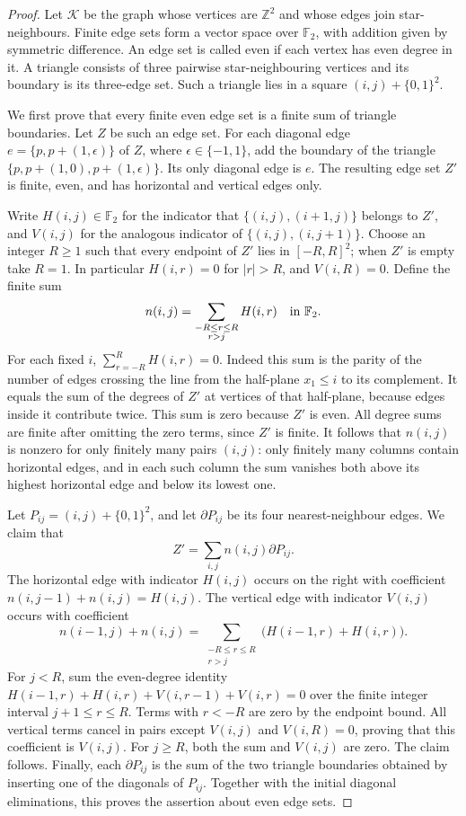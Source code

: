 \begin{proof}
Let \(\mathcal K\) be the graph whose vertices are \(\mathbb Z^2\)
and whose edges join star-neighbours.  Finite edge sets form
a vector space over \(\mathbb F_2\), with addition given by
symmetric difference.  An edge set is called even if each
vertex has even degree in it.  A triangle consists of three
pairwise star-neighbouring vertices and its boundary is its
three-edge set.  Such a triangle lies in a square
\((i,j)+\{0,1\}^2\).

We first prove that every finite even edge set is a finite
sum of triangle boundaries.  Let \(Z\) be such an edge set.
For each diagonal edge \(e=\{p,p+(1,\epsilon)\}\) of \(Z\),
where \(\epsilon\in\{-1,1\}\), add the boundary of the triangle
\(\{p,p+(1,0),p+(1,\epsilon)\}\).  Its only diagonal edge
is \(e\).  The resulting edge set \(Z'\) is finite, even,
and has horizontal and vertical edges only.

Write \(H(i,j)\in\mathbb F_2\) for the indicator that
\(\{(i,j),(i+1,j)\}\) belongs to \(Z'\), and
\(V(i,j)\) for the analogous indicator of
\(\{(i,j),(i,j+1)\}\).  Choose an integer \(R\ge1\) such that
every endpoint of \(Z'\) lies in \([-R,R]^2\); when \(Z'\) is
empty take \(R=1\).  In particular \(H(i,r)=0\) for
\(|r|>R\), and \(V(i,R)=0\).  Define the finite sum
\[
 n(i,j)=\sum_{\substack{-R\le r\le R\\r>j}}H(i,r)
                    \quad\hbox{in }\mathbb F_2.
\]
For each fixed \(i\), \(\sum_{r=-R}^R H(i,r)=0\).  Indeed this sum
is the parity of the number of edges crossing the line from
the half-plane \(x_1\le i\) to its complement.  It equals
the sum of the degrees of \(Z'\) at vertices of that
half-plane, because edges inside it contribute twice.
This sum is zero because \(Z'\) is even.  All degree sums
are finite after omitting the zero terms, since \(Z'\) is
finite.  It follows that \(n(i,j)\) is nonzero for only
finitely many pairs \((i,j)\): only finitely many columns
contain horizontal edges, and in each such column the sum
vanishes both above its highest horizontal edge and below
its lowest one.

Let \(P_{ij}=(i,j)+\{0,1\}^2\), and let \(\partial P_{ij}\)
be its four nearest-neighbour edges.  We claim that
\[
                    Z'=\sum_{i,j}n(i,j)\partial P_{ij}.
\]
The horizontal edge with indicator \(H(i,j)\) occurs on
the right with coefficient
\(n(i,j-1)+n(i,j)=H(i,j)\).
The vertical edge with indicator \(V(i,j)\) occurs with
coefficient
\[
 n(i-1,j)+n(i,j)
       =\sum_{\substack{-R\le r\le R\\r>j}}
                          \bigl(H(i-1,r)+H(i,r)\bigr).
\]
For \(j<R\), sum the even-degree identity
\(H(i-1,r)+H(i,r)+V(i,r-1)+V(i,r)=0\)
over the finite integer interval \(j+1\le r\le R\).
Terms with \(r<-R\) are zero by the endpoint bound.
All vertical terms cancel in pairs except \(V(i,j)\) and
\(V(i,R)=0\), proving that this coefficient is \(V(i,j)\).
For \(j\ge R\), both the sum and \(V(i,j)\) are zero.
The claim follows.  Finally, each \(\partial P_{ij}\) is
the sum of the two triangle boundaries obtained by inserting
one of the diagonals of \(P_{ij}\).  Together with the
initial diagonal eliminations, this proves the assertion
about even edge sets.


\end{proof}
